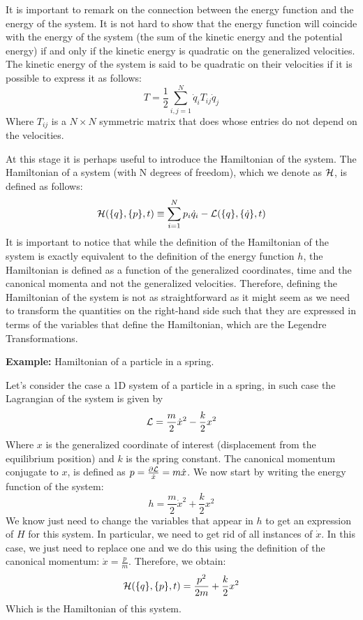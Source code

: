 \noindent It is important to remark on the connection between the energy function and the energy of the system. It is not hard to show that the energy function will coincide with the energy of the system (the sum of the kinetic energy and the potential energy) if and only if the kinetic energy is quadratic on the generalized velocities. The kinetic energy of the system is said to be quadratic on their velocities if it is possible to express it as follows: 
\begin{equation}
    T = \frac{1}{2}\sum_{i,j = 1}^N \dot q_i T_{ij} \dot q_j
\end{equation}
Where $T_{ij}$ is a $N\times N$ symmetric matrix that does whose entries do not depend on the velocities.

\vspace{1mm}\noindent At this stage it is perhaps useful to introduce the Hamiltonian of the system. The Hamiltonian of a system (with N degrees of freedom), which we denote as $\mathcal{H}$, is defined as follows:
\begin{equation}
    \mathcal{H}(\{q\},\{p\},t) \equiv \sum_{i=1}^{N} p_i \dot q_i - \mathcal{L}(\{q\},\{\dot q\},t)
\end{equation}
It is important to notice that while the definition of the Hamiltonian of the system is exactly equivalent to the definition of the energy function $h$, the Hamiltonian is defined as a function of the generalized coordinates, time and the canonical momenta and not the generalized velocities. Therefore, defining the Hamiltonian of the system is not as straightforward as it might seem as we need to transform the quantities on the right-hand side such that they are expressed in terms of the variables that define the Hamiltonian, which are the Legendre Transformations.

\vspace{1mm}\noindent \textbf{Example:} Hamiltonian of a particle in a spring. 

\vspace{1mm}\noindent Let's consider the case a 1D system of a particle in a spring, in such case the Lagrangian of the system is given by
\begin{equation}
    \mathcal{L} = \frac{m}{2}\dot x^2 - \frac{k}{2}x^2
\end{equation}
Where $x$ is the generalized coordinate of interest (displacement from the equilibrium position) and $k$ is the spring constant. The canonical momentum conjugate to $x$, is defined as $p = \frac{\partial\mathcal{L}}{\dot x} = m\dot x$. We now start by writing the energy function of the system:
\begin{equation}
    h = \frac{m}{2}\dot x^2 + \frac{k}{2}x^2 
\end{equation}
We know just need to change the variables that appear in $h$ to get an expression of $H$ for this system. In particular, we need to get rid of all instances of $\dot x$. In this case, we just need to replace one and we do this using the definition of the canonical momentum: $\dot x = \frac{p}{m}$. Therefore, we obtain:
\begin{equation}
      \mathcal{H}(\{q\},\{p\},t) = \frac{p^2}{2m}  + \frac{k}{2}x^2 
\end{equation}
Which is the Hamiltonian of this system.

